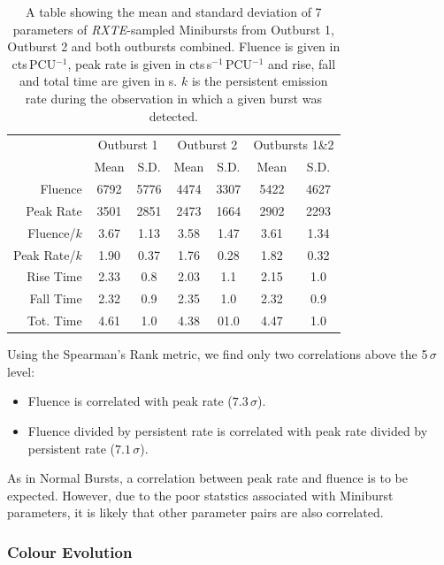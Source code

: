 \begin{table}
\centering
\begin{tabular}{r c c c c c c}
\hline
\hline
 & \multicolumn{2}{c}{\scriptsize Outburst 1} & \multicolumn{2}{c}{\scriptsize Outburst 2} & \multicolumn{2}{c}{\scriptsize Outbursts 1\&2}  \\
 &Mean&S.D.&Mean&S.D.&Mean&S.D.\\
\hline
\scriptsize Fluence&6792&5776&4474&3307&5422&4627\\
\scriptsize Peak Rate&3501&2851&2473&1664&2902&2293\\
\scriptsize Fluence/$k$&3.67&1.13&3.58&1.47&3.61&1.34\\
\scriptsize Peak Rate/$k$&1.90&0.37&1.76&0.28&1.82&0.32\\
\scriptsize Rise Time&2.33&0.8&2.03&1.1&2.15&1.0\\
\scriptsize Fall Time&2.32&0.9&2.35&1.0&2.32&0.9\\
\scriptsize Tot. Time&4.61&1.0&4.38&01.0&4.47&1.0\\
\hline
\hline
\end{tabular}
\caption[A table showing the mean and standard deviation of 7 parameters of \textit{RXTE}-sampled Minibursts from Outburst 1, Outburst 2 and both outbursts combined.]{A table showing the mean and standard deviation of 7 parameters of \textit{RXTE}-sampled Minibursts from Outburst 1, Outburst 2 and both outbursts combined.  Fluence is given in cts\,PCU$^{-1}$, peak rate is given in cts\,s$^{-1}$\,PCU$^{-1}$ and rise, fall and total time are given in s.  $k$ is the persistent emission rate during the observation in which a given burst was detected.}
\label{tab:mini_param}
\end{table}

\par Using the Spearman's Rank metric, we find only two correlations above the 5$\,\sigma$ level:
\begin{itemize}
\item Fluence is correlated with peak rate ($7.3\,\sigma$).
\item Fluence divided by persistent rate is correlated with peak rate divided by persistent rate ($7.1\,\sigma$).
\end{itemize}
As in Normal Bursts, a correlation between peak rate and fluence is to be expected.  However, due to the poor statstics associated with Miniburst parameters, it is likely that other parameter pairs are also correlated.

\subsubsection{Colour Evolution}

